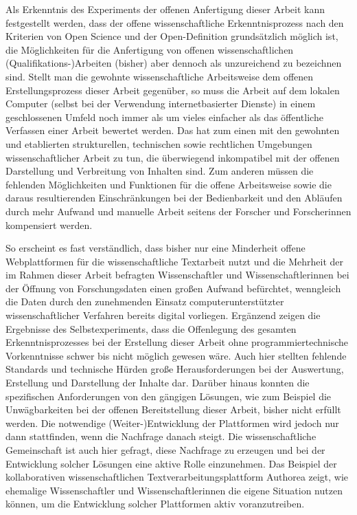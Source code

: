 Als Erkenntnis des Experiments der offenen Anfertigung dieser Arbeit kann festgestellt werden, dass der offene wissenschaftliche Erkenntnisprozess nach den Kriterien von Open Science und der Open-Definition grundsätzlich möglich ist, die Möglichkeiten für die Anfertigung von offenen wissenschaftlichen (Qualifikations-)Arbeiten (bisher) aber dennoch als unzureichend zu bezeichnen sind. Stellt man die gewohnte wissenschaftliche Arbeitsweise dem offenen Erstellungsprozess dieser Arbeit gegenüber, so muss die Arbeit auf dem lokalen Computer (selbst bei der Verwendung internetbasierter Dienste) in einem geschlossenen Umfeld noch immer als um vieles einfacher als das öffentliche Verfassen einer Arbeit bewertet werden. Das hat zum einen mit den gewohnten und etablierten strukturellen, technischen sowie rechtlichen Umgebungen wissenschaftlicher Arbeit zu tun, die überwiegend inkompatibel mit der offenen Darstellung und Verbreitung von Inhalten sind. Zum anderen müssen die fehlenden Möglichkeiten und Funktionen für die offene Arbeitsweise sowie die daraus resultierenden Einschränkungen bei der Bedienbarkeit und den Abläufen durch mehr Aufwand und manuelle Arbeit seitens der Forscher und Forscherinnen kompensiert werden.

So erscheint es fast verständlich, dass bisher nur eine Minderheit offene Webplattformen für die wissenschaftliche Textarbeit \cite{Perkel_2014} nutzt und die Mehrheit der im Rahmen dieser Arbeit befragten Wissenschaftler und Wissenschaftlerinnen bei der Öffnung von Forschungsdaten einen großen Aufwand befürchtet, wenngleich die Daten durch den zunehmenden Einsatz computerunterstützter wissenschaftlicher Verfahren bereits digital vorliegen. Ergänzend zeigen die Ergebnisse des Selbstexperiments, dass die Offenlegung des gesamten Erkenntnisprozesses bei der Erstellung dieser Arbeit ohne programmiertechnische Vorkenntnisse schwer bis nicht möglich gewesen wäre. Auch hier stellten fehlende Standards und technische Hürden große Herausforderungen bei der Auswertung, Erstellung und Darstellung der Inhalte dar. Darüber hinaus konnten die spezifischen Anforderungen von den gängigen Lösungen, wie zum Beispiel die Unwägbarkeiten bei der offenen Bereitstellung dieser Arbeit, bisher nicht erfüllt werden. Die notwendige (Weiter-)Entwicklung der Plattformen wird jedoch nur dann stattfinden, wenn die Nachfrage danach steigt. Die wissenschaftliche Gemeinschaft ist auch hier gefragt, diese Nachfrage zu erzeugen und bei der Entwicklung solcher Lösungen eine aktive Rolle einzunehmen. Das Beispiel der kollaborativen wissenschaftlichen Textverarbeitungsplattform Authorea zeigt, wie ehemalige Wissenschaftler und Wissenschaftlerinnen die eigene Situation nutzen können, um die Entwicklung solcher Plattformen aktiv voranzutreiben.

